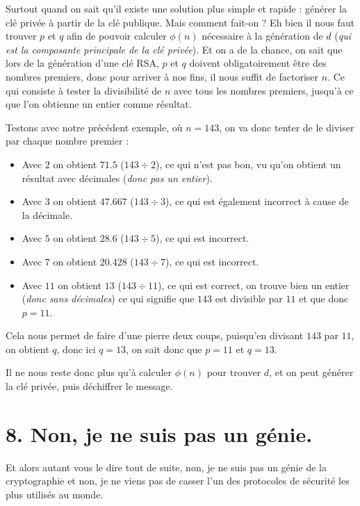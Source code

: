 \documentclass[
  paper=a4,
  ,captions=tableheading
]{scrartcl}
\providecommand{\tightlist}{%
  \setlength{\itemsep}{0pt}\setlength{\parskip}{0pt}}
\begin{document}
Surtout quand on sait qu'il existe une solution plus simple et rapide :
générer la clé privée à partir de la clé publique. Mais comment fait-on
? Eh bien il nous faut trouver \(p\) et \(q\) afin de pouvoir calculer
\(\phi(n)\) nécessaire à la génération de \(d\) (\emph{qui est la
composante principale de la clé privée}). Et on a de la chance, on sait
que lors de la génération d'une clé RSA, \(p\) et \(q\) doivent
obligatoirement être des nombres premiers, donc pour arriver à nos fins,
il nous suffit de factoriser \(n\). Ce qui consiste à tester la
divisibilité de \(n\) avec tous les nombres premiers, jusqu'à ce que
l'on obtienne un entier comme résultat.

Testons avec notre précédent exemple, où \(n = 143\), on va donc tenter
de le diviser par chaque nombre premier :

\begin{itemize}
\tightlist
\item
  Avec \(2\) on obtient \(71.5\) (\(143 \div 2\)), ce qui n'est pas bon,
  vu qu'on obtient un résultat avec décimales (\emph{donc pas un
  entier}).
\item
  Avec \(3\) on obtient \(47.667\) (\(143\div3\)), ce qui est également
  incorrect à cause de la décimale.
\item
  Avec \(5\) on obtient \(28.6\) (\(143\div5\)), ce qui est incorrect.
\item
  Avec \(7\) on obtient \(20.428\) (\(143\div7\)), ce qui est incorrect.
\item
  Avec \(11\) on obtient \(13\) (\(143\div11\)), ce qui est correct, on
  trouve bien un entier (\emph{donc sans décimales}) ce qui signifie que
  \(143\) est divisible par \(11\) et que donc \(p = 11\).
\end{itemize}

Cela nous permet de faire d'une pierre deux coups, puisqu'en divisant
\(143\) par \(11\), on obtient \(q\), donc ici \(q = 13\), on sait donc
que \(p = 11\) et \(q = 13\).

Il ne nous reste donc plus qu'à calculer \(\phi(n)\) pour trouver \(d\),
et on peut générer la clé privée, puis déchiffrer le message.

\section{8. Non, je ne suis pas un
génie.}\label{non-je-ne-suis-pas-un-guxe9nie.}

Et alors autant vous le dire tout de suite, non, je ne suis pas un génie
de la cryptographie et non, je ne viens pas de casser l'un des
protocoles de sécurité les plus utilisés au monde.
\end{document}
